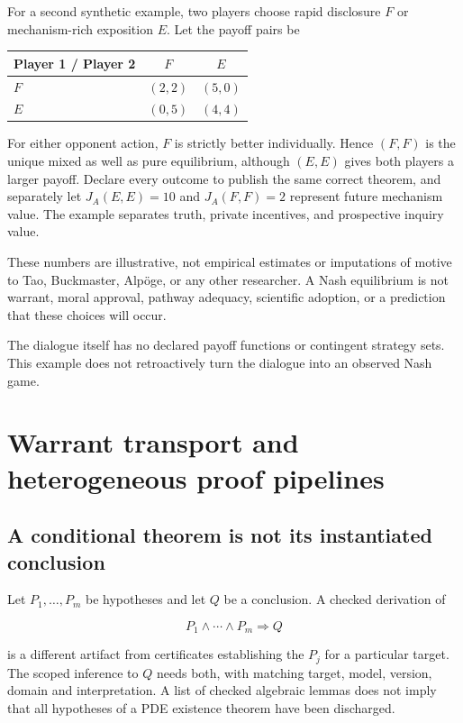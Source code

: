 \documentclass[11pt,a4paper]{article}
\begin{document}
For a second synthetic example, two players choose rapid disclosure
\(F\) or mechanism-rich exposition \(E\). Let the payoff pairs be

\begin{longtable}[]{@{}lcc@{}}
\toprule\noalign{}
Player 1 / Player 2 & \(F\) & \(E\) \\
\midrule\noalign{}
\endhead
\bottomrule\noalign{}
\endlastfoot
\(F\) & \((2,2)\) & \((5,0)\) \\
\(E\) & \((0,5)\) & \((4,4)\) \\
\end{longtable}

For either opponent action, \(F\) is strictly better individually. Hence
\((F,F)\) is the unique mixed as well as pure equilibrium, although
\((E,E)\) gives both players a larger payoff. Declare every outcome to
publish the same correct theorem, and separately let \(J_A(E,E)=10\) and
\(J_A(F,F)=2\) represent future mechanism value. The example separates
truth, private incentives, and prospective inquiry value.

These numbers are illustrative, not empirical estimates or imputations
of motive to Tao, Buckmaster, Alpöge, or any other researcher. A Nash
equilibrium is not warrant, moral approval, pathway adequacy, scientific
adoption, or a prediction that these choices will occur.

The dialogue itself has no declared payoff functions or contingent
strategy sets. This example does not retroactively turn the dialogue
into an observed Nash game.

\section{Warrant transport and heterogeneous proof
pipelines}\label{warrant-transport-and-heterogeneous-proof-pipelines}

\subsection{A conditional theorem is not its instantiated
conclusion}\label{a-conditional-theorem-is-not-its-instantiated-conclusion}

Let \(P_1,\ldots,P_m\) be hypotheses and let \(Q\) be a conclusion. A
checked derivation of

\nopagebreak[4]

\[P_1\land\cdots\land P_m\Longrightarrow Q\]

is a different artifact from certificates establishing the \(P_j\) for a
particular target. The scoped inference to \(Q\) needs both, with
matching target, model, version, domain and interpretation. A list of
checked algebraic lemmas does not imply that all hypotheses of a PDE
existence theorem have been discharged.
\end{document}
